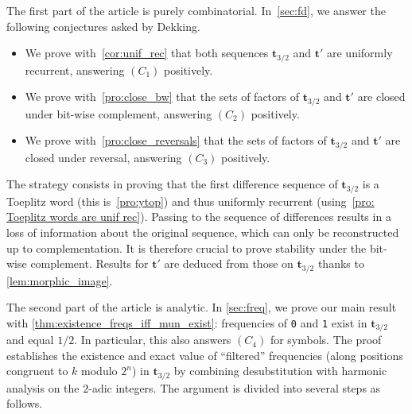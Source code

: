 \documentclass[12pt,reqno]{article}
\begin{document}
The first part of the article is purely combinatorial. In~\cref{sec:fd}, we answer the following conjectures asked by Dekking.
\begin{itemize}
\item We prove with~\cref{cor:unif_rec} that both sequences $\mathbf{t}_{3/2}$ and $\mathbf{t}'$ are uniformly recurrent, answering $(C_1)$ positively.
\item We prove with~\cref{pro:close_bw} that the sets of factors of $\mathbf{t}_{3/2}$  and $\mathbf{t}'$ are closed under bit-wise complement, answering $(C_2)$ positively.
\item We prove with~\cref{pro:close_reversals} that the sets of factors of $\mathbf{t}_{3/2}$  and $\mathbf{t}'$ are closed under reversal, answering $(C_3)$ positively. 
\end{itemize}
The strategy consists in proving that the first difference sequence of $\mathbf{t}_{3/2}$ is a Toeplitz word (this is~\cref{pro:ytop}) and thus uniformly recurrent (using~\cref{pro: Toeplitz words are unif rec}).  Passing to the sequence of differences results in a loss of information about the original sequence, which can only be reconstructed up to complementation. It is therefore crucial to prove stability under the bit-wise complement. Results for $\mathbf{t}'$ are deduced from those on $\mathbf{t}_{3/2}$ thanks to \cref{lem:morphic_image}.


\medskip


The second part of the article  is analytic. In \cref{sec:freq}, we prove our main result with \cref{thm:existence_freqs_iff_mun_exist}: frequencies of {\tt 0} and {\tt 1} exist in $\mathbf{t}_{3/2}$ and equal $1/2$. In particular, this also answers $(C_4)$ for symbols. The proof establishes the existence and exact value of ``filtered'' frequencies (along positions congruent to $k$ modulo $2^n$) in $\mathbf{t}_{3/2}$ by combining desubstitution with harmonic analysis on the $2$-adic integers.
The argument is divided into several steps as follows.
\end{document}
